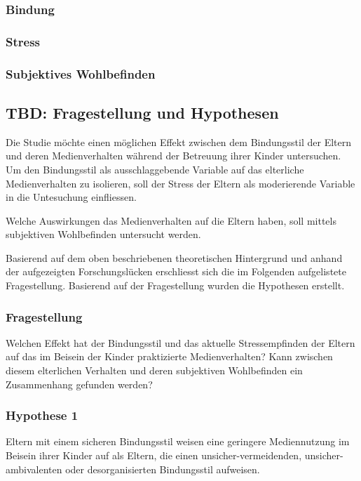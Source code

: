 \subsubsection{Bindung}\label{sec:Bindung}

\subsubsection{Stress}\label{sec:Stress}

\subsubsection{Subjektives Wohlbefinden}\label{sec:Swb}






\subsection{TBD: Fragestellung und Hypothesen} \label{sec:Fragestellung}
Die Studie möchte einen möglichen Effekt zwischen dem Bindungsstil der Eltern und deren Medienverhalten während der Betreuung ihrer Kinder untersuchen. Um den Bindungsstil als ausschlaggebende Variable auf das elterliche Medienverhalten zu isolieren, soll der Stress der Eltern als moderierende Variable in die Untesuchung einfliessen.

Welche Auswirkungen das Medienverhalten auf die Eltern haben, soll mittels subjektiven Wohlbefinden  untersucht werden. 

Basierend auf dem oben beschriebenen theoretischen Hintergrund und anhand der aufgezeigten Forschungslücken erschliesst sich die im Folgenden aufgelistete Fragestellung. Basierend auf der Fragestellung wurden die Hypothesen erstellt.
\subsubsection{Fragestellung} 
Welchen Effekt hat der Bindungsstil und das aktuelle Stressempfinden der Eltern auf das im Beisein der Kinder praktizierte Medienverhalten? Kann zwischen diesem elterlichen Verhalten und deren subjektiven Wohlbefinden ein Zusammenhang gefunden werden?
\subsubsection{Hypothese 1}
Eltern mit einem sicheren Bindungsstil weisen eine geringere Mediennutzung im Beisein ihrer Kinder auf als Eltern, die einen unsicher-vermeidenden, unsicher-ambivalenten oder desorganisierten Bindungsstil aufweisen.
